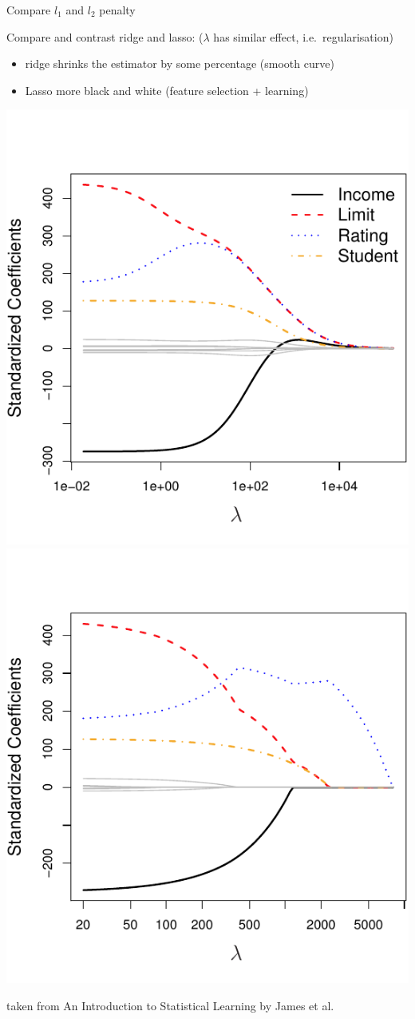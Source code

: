 \documentclass[ignorenonframetext,aspectratio=169]{beamer}
\providecommand{\tightlist}{%
  \setlength{\itemsep}{0pt}\setlength{\parskip}{0pt}}
\begin{document}
\begin{frame}{Compare \(l_1\) and \(l_2\) penalty}
\protect\hypertarget{compare-l_1-and-l_2-penalty}{}

Compare and contrast ridge and lasso: (\(\lambda\) has similar effect,
i.e.~regularisation)

\begin{itemize}
\tightlist
\item
  ridge shrinks the estimator by some percentage (smooth curve)
\item
  Lasso more black and white (feature selection + learning)
\end{itemize}

\vspace{-0.8cm}

\begin{center}\includegraphics[width=0.38\linewidth]{./figs/lec10_ridge} \includegraphics[width=0.38\linewidth]{./figs/lec10_lasso} \end{center}

\footnotesize taken from An Introduction to Statistical Learning by
James et al.\\

\end{frame}
\end{document}
